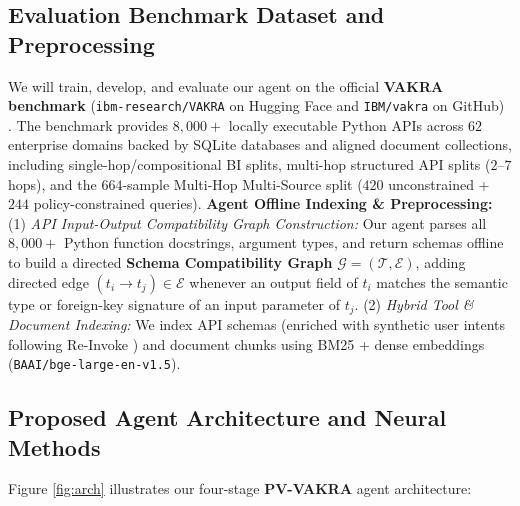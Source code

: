 \documentclass[10pt]{article}
\begin{document}
\subsection{Evaluation Benchmark Dataset and Preprocessing}
We will train, develop, and evaluate our agent on the official \textbf{VAKRA benchmark} (\texttt{ibm-research/VAKRA} on Hugging Face and \texttt{IBM/vakra} on GitHub) \cite{naik2026vakra}. The benchmark provides $8,000+$ locally executable Python APIs across $62$ enterprise domains backed by SQLite databases and aligned document collections, including single-hop/compositional BI splits, multi-hop structured API splits ($2\text{--}7$ hops), and the $664$-sample Multi-Hop Multi-Source split ($420$ unconstrained + $244$ policy-constrained queries).
\textbf{Agent Offline Indexing \& Preprocessing:}
(1) \textit{API Input-Output Compatibility Graph Construction:} Our agent parses all $8,000+$ Python function docstrings, argument types, and return schemas offline to build a directed \textbf{Schema Compatibility Graph} $\mathcal{G} = (\mathcal{T}, \mathcal{E})$, adding directed edge $(t_i \rightarrow t_j) \in \mathcal{E}$ whenever an output field of $t_i$ matches the semantic type or foreign-key signature of an input parameter of $t_j$.
(2) \textit{Hybrid Tool \& Document Indexing:} We index API schemas (enriched with synthetic user intents following Re-Invoke \cite{chen2024reinvoke}) and document chunks using BM25 + dense embeddings (\texttt{BAAI/bge-large-en-v1.5}).

\subsection{Proposed Agent Architecture and Neural Methods}
Figure \ref{fig:arch} illustrates our four-stage \textbf{PV-VAKRA} agent architecture:
\end{document}

